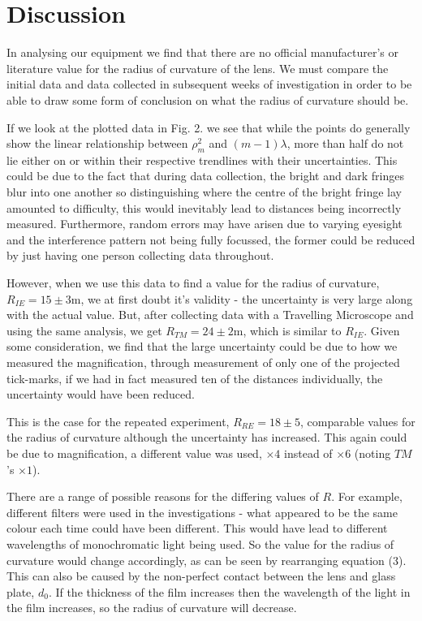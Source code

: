 \documentclass[twocolumn]{revtex4}
\begin{document}
\vspace{-3ex}
\section{Discussion}
\vspace{-2ex}
In analysing our equipment we find that there are no official manufacturer's or literature value for the radius of curvature of the lens. We must compare the initial data and data collected in subsequent weeks of investigation in order to be able to draw some form of conclusion on what the radius of curvature should be. 

If we look at the plotted data in Fig. 2. we see that while the points do generally show the linear relationship between $\rho_m^2$ and $(m-1)\lambda$, more than half do not lie either on or within their respective trendlines with their uncertainties. This could be due to the fact that during data collection, the bright and dark fringes blur into one another so distinguishing where the centre of the bright fringe lay amounted to difficulty, this would inevitably lead to distances being incorrectly measured. Furthermore, random errors may have arisen due to varying eyesight and the interference pattern not being fully focussed, the former could be reduced by just having one person collecting data throughout. 

However, when we use this data to find a value for the radius of curvature, $R_{IE}=15\pm3$m, we at first doubt it's validity - the uncertainty is very large along with the actual value. But, after collecting data with a Travelling Microscope and using the same analysis, we get $R_{TM}=24\pm2$m, which is similar to $R_{IE}$. Given some consideration, we find that the large uncertainty could be due to how we measured the magnification, through measurement of only one of the projected tick-marks, if we had in fact measured ten of the distances individually, the uncertainty would have been reduced. 

\vspace{-0.5ex}

This is the case for the repeated experiment, $R_{RE}=18\pm5$, comparable values for the radius of curvature although the uncertainty has increased. This again could be due to magnification, a different value was used, $\times4$ instead of $\times6$ (noting $TM$'s $\times1$). 

There are a range of possible reasons for the differing values of $R$. For example, different filters were used in the investigations - what appeared to be the same colour each time could have been different. This would have lead to different wavelengths of monochromatic light being used. So the value for the radius of curvature would change accordingly, as can be seen by rearranging equation (3). This can also be caused by the non-perfect contact between the lens and glass plate, $d_0$. If the thickness of the film increases then the wavelength of the light in the film increases, so the radius of curvature will decrease.
\end{document}
